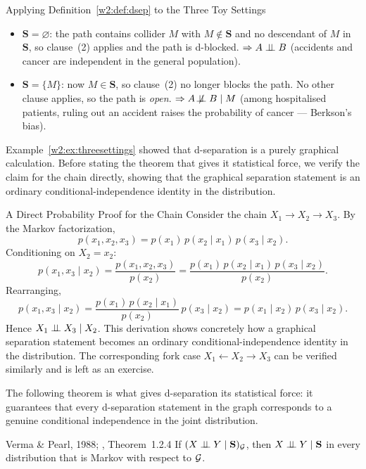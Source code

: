 \documentclass[master.tex]{subfiles}
\begin{document}
\begin{example}{Applying Definition~\ref{w2:def:dsep} to the Three Toy Settings}
\begin{itemize}
  \item $\mathbf{S} = \varnothing$: the path contains collider $M$
        with $M \notin \mathbf{S}$ and no descendant of $M$ in
        $\mathbf{S}$, so clause~(2) applies and the path is d-blocked.
        $\Rightarrow A \perp\!\!\!\perp B$ (accidents and cancer are
        independent in the general population).
  \item $\mathbf{S} = \{M\}$: now $M \in \mathbf{S}$, so clause~(2) no
        longer blocks the path.  No other clause applies, so the path is
        \emph{open}.
        $\Rightarrow A \not\!\perp\!\!\!\perp B \mid M$ (among hospitalised
        patients, ruling out an accident raises the probability of cancer ---
        Berkson's bias).
\end{itemize}
\end{example}

Example~\ref{w2:ex:threesettings} showed that d-separation is a purely graphical
calculation.  Before stating the theorem that gives it statistical force,
we verify the claim for the chain directly, showing that the graphical
separation statement is an ordinary conditional-independence identity in
the distribution.

\begin{example}{A Direct Probability Proof for the Chain}
\label{w2:ex:chainproof}
Consider the chain $X_1 \to X_2 \to X_3$.  By the Markov factorization,
\[
  p(x_1, x_2, x_3) = p(x_1)\,p(x_2 \mid x_1)\,p(x_3 \mid x_2).
\]
Conditioning on $X_2 = x_2$:
\[
  p(x_1, x_3 \mid x_2)
  = \frac{p(x_1, x_2, x_3)}{p(x_2)}
  = \frac{p(x_1)\,p(x_2 \mid x_1)\,p(x_3 \mid x_2)}{p(x_2)}.
\]
Rearranging,
\[
  p(x_1, x_3 \mid x_2)
  = \frac{p(x_1)\,p(x_2 \mid x_1)}{p(x_2)}\,p(x_3 \mid x_2)
  = p(x_1 \mid x_2)\,p(x_3 \mid x_2).
\]
Hence $X_1 \perp\!\!\!\perp X_3 \mid X_2$.
This derivation shows concretely how a graphical separation statement
becomes an ordinary conditional-independence identity in the distribution.
The corresponding fork case $X_1 \leftarrow X_2 \to X_3$ can be verified
similarly and is left as an exercise.
\end{example}

The following theorem is what gives d-separation its statistical force: it
guarantees that every d-separation statement in the graph corresponds to a
genuine conditional independence in the joint distribution.

\begin{thm}{Verma \& Pearl, 1988; \citep{pearl2009causality}, Theorem~1.2.4}
\label{w2:thm:dsep}
If $(X \perp\!\!\!\perp Y \mid \mathbf{S})_{\mathcal{G}}$, then
$X \perp\!\!\!\perp Y \mid \mathbf{S}$ in every distribution that is Markov
with respect to $\mathcal{G}$.
\end{thm}
\end{document}
